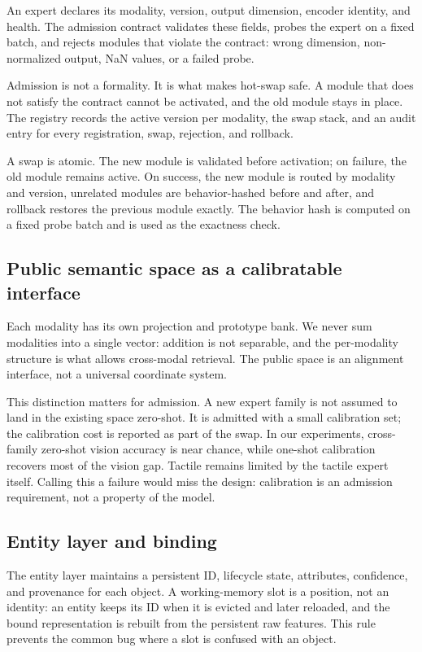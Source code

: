 \documentclass[10pt]{article}
\begin{document}
An expert declares its modality, version, output dimension, encoder identity,
and health. The admission contract validates these fields, probes the expert on
a fixed batch, and rejects modules that violate the contract: wrong dimension,
non-normalized output, NaN values, or a failed probe.

Admission is not a formality. It is what makes hot-swap safe. A module that
does not satisfy the contract cannot be activated, and the old module stays in
place. The registry records the active version per modality, the swap stack, and
an audit entry for every registration, swap, rejection, and rollback.

A swap is atomic. The new module is validated before activation; on failure, the
old module remains active. On success, the new module is routed by modality and
version, unrelated modules are behavior-hashed before and after, and rollback
restores the previous module exactly. The behavior hash is computed on a fixed
probe batch and is used as the exactness check.

\subsection{Public semantic space as a calibratable interface}

Each modality has its own projection and prototype bank. We never sum
modalities into a single vector: addition is not separable, and the
per-modality structure is what allows cross-modal retrieval. The public space is
an alignment interface, not a universal coordinate system.

This distinction matters for admission. A new expert family is not assumed to
land in the existing space zero-shot. It is admitted with a small calibration
set; the calibration cost is reported as part of the swap. In our experiments,
cross-family zero-shot vision accuracy is near chance, while one-shot
calibration recovers most of the vision gap. Tactile remains limited by the
tactile expert itself. Calling this a failure would miss the design: calibration
is an admission requirement, not a property of the model.

\subsection{Entity layer and binding}

The entity layer maintains a persistent ID, lifecycle state, attributes,
confidence, and provenance for each object. A working-memory slot is a
position, not an identity: an entity keeps its ID when it is evicted and later
reloaded, and the bound representation is rebuilt from the persistent raw
features. This rule prevents the common bug where a slot is confused with an
object.
\end{document}
